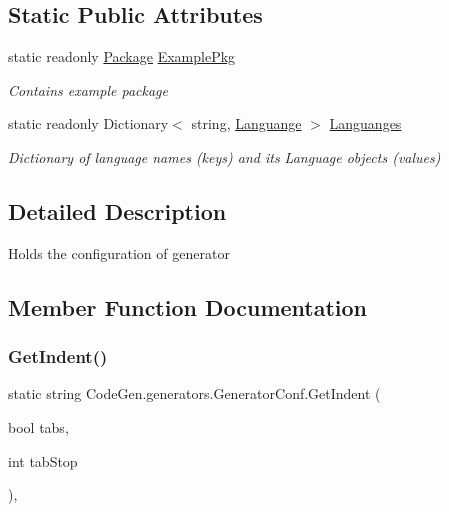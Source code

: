 \subsection*{Static Public Attributes}
\begin{DoxyCompactItemize}
\item 
static readonly \mbox{\hyperlink{classCodeGen_1_1generators_1_1Package}{Package}} \mbox{\hyperlink{classCodeGen_1_1generators_1_1GeneratorConf_a9680e7722e2eb32214fa8ac1476f7903}{Example\+Pkg}}
\begin{DoxyCompactList}\small\item\em Contains example package \end{DoxyCompactList}\item 
static readonly Dictionary$<$ string, \mbox{\hyperlink{structCodeGen_1_1generators_1_1Languange}{Languange}} $>$ \mbox{\hyperlink{classCodeGen_1_1generators_1_1GeneratorConf_a830f7e81defcc68af267575792253b35}{Languanges}}
\begin{DoxyCompactList}\small\item\em Dictionary of language names (keys) and its Language objects (values) \end{DoxyCompactList}\end{DoxyCompactItemize}


\subsection{Detailed Description}
Holds the configuration of generator 



\subsection{Member Function Documentation}
\mbox{\label{classCodeGen_1_1generators_1_1GeneratorConf_a00082fad632c4dda77b1b025d1b2b280}} 
\subsubsection{\texorpdfstring{Get\+Indent()}{GetIndent()}}
{\footnotesize\ttfamily static string Code\+Gen.\+generators.\+Generator\+Conf.\+Get\+Indent (\begin{DoxyParamCaption}\item[{bool}]{tabs,  }\item[{int}]{tab\+Stop }\end{DoxyParamCaption})\hspace{0.3cm}{\ttfamily [inline]}, {\ttfamily [static]}}



